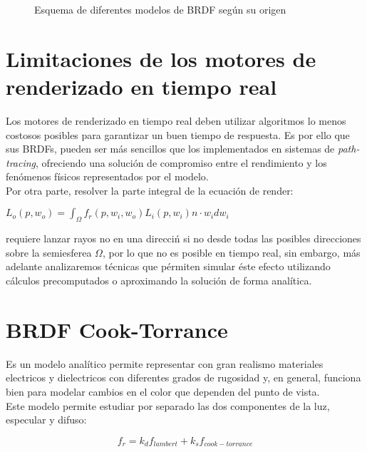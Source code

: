     \begin{figure}[H]
        \centering
        \caption{Esquema de diferentes modelos de BRDF seg\'un su origen}
        \vspace{0.5cm}
    \end{figure}

    \section{Limitaciones de los motores de renderizado en tiempo real}
    Los motores de renderizado en tiempo real deben utilizar algoritmos lo menos costosos posibles para garantizar un buen
    tiempo de respuesta. Es por ello que sus BRDFs, pueden ser m\'as sencillos que los implementados en sistemas de \textit{path-tracing},
    ofreciendo una soluci\'on de compromiso entre el rendimiento y los fen\'omenos f\'isicos representados por el modelo.\\
    
    Por otra parte, resolver la parte integral de la ecuaci\'on de render:

    \begin{center}$L_o(p, w_o) = \int_{\Omega} f_r(p, w_i, w_o)L_i(p, w_i)n\cdot{w_i}dw_i$\end{center}
    \singlespacing
    requiere lanzar rayos no en una direcci\'n si no desde todas las posibles direcciones sobre la semiesferea $\Omega$, por
    lo que no es posible en tiempo real, sin embargo, m\'as adelante analizaremos t\'ecnicas que p\'ermiten simular \'este
    efecto utilizando c\'alculos precomputados o aproximando la soluci\'on de forma anal\'itica.\\


    \section{BRDF Cook-Torrance}
    Es un modelo anal\'itico permite representar con gran realismo materiales electricos y dielectricos con diferentes
    grados de rugosidad y, en general, funciona bien para modelar cambios en el color que dependen del punto de vista.\\
    Este modelo permite estudiar por separado las dos componentes de la luz, especular y difuso:
    
    \begin{eqfloat}[!htb]
        \begin{equation}
            f_r = k_{d}f_{lambert} + k_sf_{cook-torrance}
        \end{equation}
        \caption{BRDF como suma de la componente difusa y especular}
    \end{eqfloat}
    
